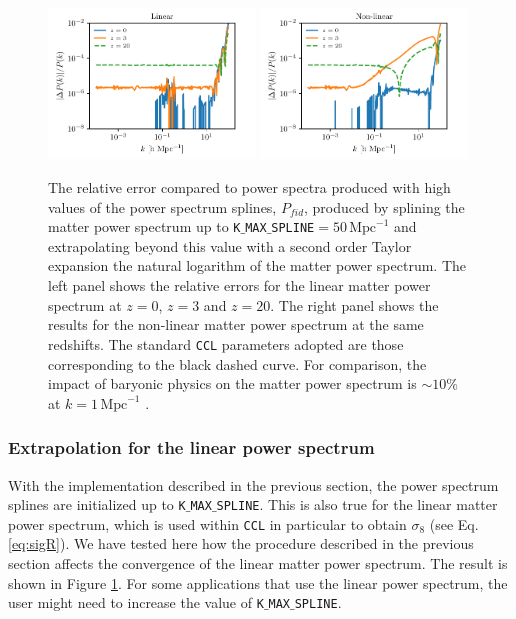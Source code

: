 \documentclass[\docopts]{\docclass}
\newcommand{\ccl}{{\tt CCL}\xspace}
\begin{document}
\begin{figure}
\centering
  \includegraphics[width=0.49\textwidth]{splacc_power_lin}
  \includegraphics[width=0.49\textwidth]{splacc_power_nl}
\caption{
    The relative error compared to power spectra produced with high values of the
    power spectrum splines, $P_{fid}$, produced by splining the matter power
    spectrum up to {\tt K$\_$MAX$\_$SPLINE}$=50\,\text{Mpc}^{-1}$ and extrapolating
    beyond this value with a second order Taylor expansion the natural logarithm of
    the matter power spectrum. The left panel shows the relative errors for the
    linear matter power spectrum at $z=0$, $z=3$ and $z=20$. The right panel shows
    the results for the non-linear matter power spectrum at the same redshifts. The
    standard \ccl parameters adopted are those corresponding to the black dashed
    curve. For comparison, the impact of baryonic physics on the matter power
    spectrum is $\sim 10\%$ at $k=1\,\text{Mpc}^{-1}$ \citep{Schneider15}.}
\label{fig:NLextrapol}
\end{figure}

\subsubsection{Extrapolation for the linear power spectrum}
\label{sec:Lextrapol}

With the implementation described in the previous section, the power spectrum
splines are initialized up to {\tt K$\_$MAX$\_$SPLINE}. This is also true for
the linear matter power spectrum, which is used within \ccl in particular to
obtain $\sigma_8$ (see Eq. \ref{eq:sigR}). We have tested here how the procedure
described in the previous section affects the convergence of the linear
matter power spectrum. The result is shown in Figure \ref{fig:NLextrapol}. For
some applications that use the linear power spectrum, the user might need to
increase the value of {\tt K$\_$MAX$\_$SPLINE}.
\end{document}
